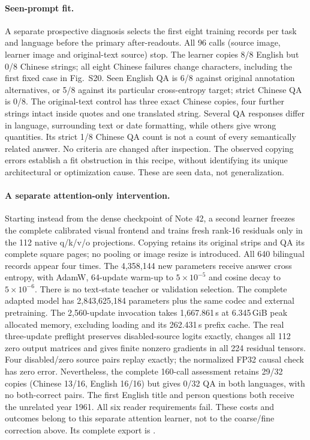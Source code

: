 \paragraph{Seen-prompt fit.}
A separate prospective diagnosis selects the first eight training records
per task and language before the primary after-readouts. All 96 calls
(source image, learner image and original-text source) stop. The learner
copies 8/8 English but 0/8 Chinese strings; all eight Chinese failures change
characters, including the first fixed case in Fig.~S20. Seen English QA
is 6/8 against original annotation alternatives, or 5/8 against its particular
cross-entropy target; strict Chinese QA is 0/8. The original-text control has
three exact Chinese copies, four further strings intact inside quotes and
one translated string. Several QA responses differ in language, surrounding
text or date formatting, while others give wrong quantities. Its strict 1/8
Chinese QA count is not a count of every semantically related answer.
No criteria are changed after inspection. The observed copying errors
establish a fit obstruction in this recipe, without identifying its unique
architectural or optimization cause. These are seen data, not generalization.

\paragraph{A separate attention-only intervention.}
Starting instead from the dense checkpoint of Note 42, a second learner
freezes the complete calibrated visual frontend and trains fresh rank-16
residuals only in the 112 native q/k/v/o projections. Copying retains its
original strips and QA its complete square pages; no pooling or image resize
is introduced. All 640 bilingual records appear four times. The 4,358,144
new parameters receive answer cross entropy, with AdamW, 64-update warm-up
to $5\times10^{-5}$ and cosine decay to $5\times10^{-6}$. There is no
text-state teacher or validation selection. The complete adapted model has
2,843,625,184 parameters plus the same codec and external pretraining.
The 2,560-update invocation takes 1,667.861\,s at 6.345\,GiB peak allocated
memory, excluding loading and its 262.431\,s prefix cache. The real
three-update preflight preserves disabled-source logits exactly, changes
all 112 zero output matrices and gives finite nonzero gradients in all
224 residual tensors. Four disabled/zero source pairs replay exactly;
the normalized FP32 causal check has zero error. Nevertheless, the complete
160-call assessment retains 29/32 copies (Chinese 13/16, English 16/16)
but gives 0/32 QA in both languages, with no both-correct pairs. The first
English title and person questions both receive the unrelated year 1961.
All six reader requirements fail. These costs and outcomes belong to this
separate attention learner, not to the coarse/fine correction above. Its
complete export is .

